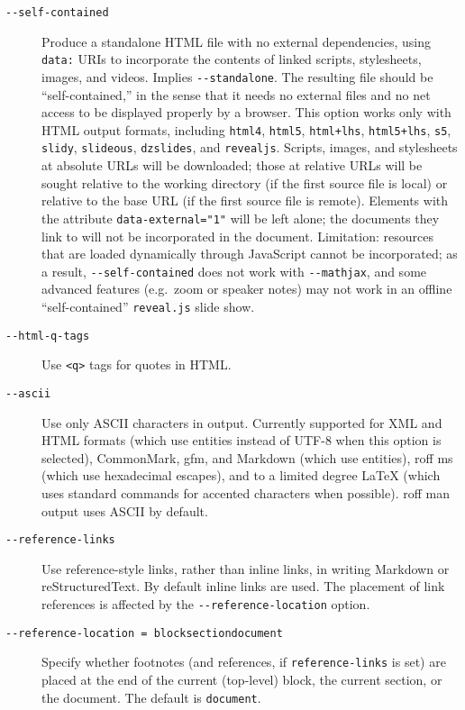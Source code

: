 \begin{description}
\item[\texttt{-\/-self-contained}]
Produce a standalone HTML file with no external dependencies, using
\texttt{data:} URIs to incorporate the contents of linked scripts,
stylesheets, images, and videos. Implies \texttt{-\/-standalone}. The
resulting file should be ``self-contained,'' in the sense that it needs
no external files and no net access to be displayed properly by a
browser. This option works only with HTML output formats, including
\texttt{html4}, \texttt{html5}, \texttt{html+lhs}, \texttt{html5+lhs},
\texttt{s5}, \texttt{slidy}, \texttt{slideous}, \texttt{dzslides}, and
\texttt{revealjs}. Scripts, images, and stylesheets at absolute URLs
will be downloaded; those at relative URLs will be sought relative to
the working directory (if the first source file is local) or relative to
the base URL (if the first source file is remote). Elements with the
attribute \texttt{data-external="1"} will be left alone; the documents
they link to will not be incorporated in the document. Limitation:
resources that are loaded dynamically through JavaScript cannot be
incorporated; as a result, \texttt{-\/-self-contained} does not work
with \texttt{-\/-mathjax}, and some advanced features (e.g.~zoom or
speaker notes) may not work in an offline ``self-contained''
\texttt{reveal.js} slide show.
\item[\texttt{-\/-html-q-tags}]
Use \texttt{\textless{}q\textgreater{}} tags for quotes in HTML.
\item[\texttt{-\/-ascii}]
Use only ASCII characters in output. Currently supported for XML and
HTML formats (which use entities instead of UTF-8 when this option is
selected), CommonMark, gfm, and Markdown (which use entities), roff ms
(which use hexadecimal escapes), and to a limited degree LaTeX (which
uses standard commands for accented characters when possible). roff man
output uses ASCII by default.
\item[\texttt{-\/-reference-links}]
Use reference-style links, rather than inline links, in writing Markdown
or reStructuredText. By default inline links are used. The placement of
link references is affected by the \texttt{-\/-reference-location}
option.
\item[\texttt{-\/-reference-location\ =\ block}\textbar{}\texttt{section}\textbar{}\texttt{document}]
Specify whether footnotes (and references, if \texttt{reference-links}
is set) are placed at the end of the current (top-level) block, the
current section, or the document. The default is \texttt{document}.

\end{description}
